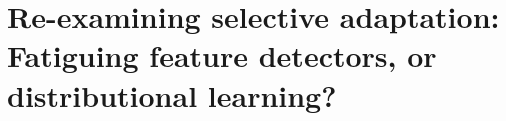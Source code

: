 


\chapter[Re-examining selective adaptation: Fatiguing feature detectors, or distributional learning?]{Re-examining selective adaptation: Fatiguing feature detectors, or distributional learning?\protect\footnotemark{}}\label{chap:selective-adaptation}



